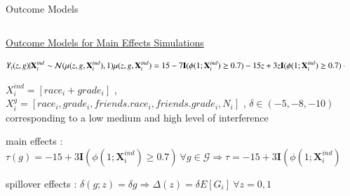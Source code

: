 \documentclass[notes,11pt, aspectratio=169]{beamer}
\begin{document}
\begin{frame}{Outcome Models }
\begin{columns}[T] %
\begin{column}{1\textwidth}
\begin{wideitemize}
    \item \underline{Outcome Models for Main Effects Simulations}
    \begin{center}
    \begin{equation*}
        Y_i(z,g)|\mathbf{X}_{i}^{ind} \sim \mathcal{N}(\mu(z,g,\mathbf{X}_{i}^{ind}),1) \\
        \mu(z,g,\mathbf{X}_{i}^{ind})=15-7\mathbf{I}(\phi(1;\mathbf{X}_{i}^{ind}) \geq 0.7)-15z+3z\mathbf{I}(\phi(1;\mathbf{X}_{i}^{ind}) \geq 0.7)+\delta g
    \end{equation*}    
    \end{center}
    \item $X_i^{ind}=[race_i+grade_i]$ , $X_i^{g}=[race_i , grade_i , friends.race_i ,  friends.grade_i , N_i]$ , $\delta \in (-5,-8,-10)$ corresponding to a low medium and high level of interference
    \item main effects : $\tau(g)=-15+3\mathbf{I}(\phi(1;\mathbf{X}_{i}^{ind}) \geq 0.7) \  \forall g \in \mathcal{G}  \Longrightarrow \tau=-15+3\mathbf{I}(\phi(1;\mathbf{X}_{i}^{ind}) \geq 0.7) $
    \item spillover effects : $\delta(g;z)=\delta g \Longrightarrow \Delta(z)=\delta E[G_i] \  \forall z =0 , 1$
\end{wideitemize}
\end{column}%
\hfill%
\begin{column}{.38\textwidth}
  \vspace{20pt}
  \vspace{20pt}
\end{column}%
\end{columns}
\end{frame}
\end{document}
